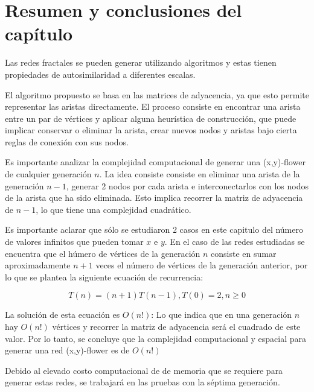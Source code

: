\section{Resumen y conclusiones del capítulo}

Las redes fractales se pueden generar utilizando algoritmos y estas tienen propiedades de autosimilaridad a diferentes escalas.

El algoritmo propuesto se basa en las matrices de adyacencia, ya que esto permite representar las aristas directamente. El proceso consiste en encontrar una arista entre un par de vértices y aplicar alguna heurística de construcción, que puede implicar conservar o eliminar la arista, crear nuevos nodos y aristas bajo cierta reglas de conexión con sus nodos.

Es importante analizar la complejidad computacional de generar una (x,y)-flower de cualquier generación $n$. La idea consiste consiste en eliminar una arista de la generación $n-1$, generar 2 nodos por cada arista e interconectarlos con los nodos de la arista que ha sido eliminada. Esto implica recorrer la matriz de adyacencia de $n-1$, lo que tiene una complejidad cuadrático.

Es importante aclarar que sólo se estudiaron 2 casos en este capitulo del número de valores infinitos que pueden tomar $x$ e $y$. En el caso de las redes estudiadas se encuentra que el húmero de vértices de la generación $n$ consiste en sumar aproximadamente $n+1$ veces el número de vértices de la generación anterior, por lo que se plantea la siguiente ecuación de recurrencia:

\begin{equation}
    T(n)=(n+1)T(n-1), T(0)=2, n \geq 0
\end{equation}

La solución de esta ecuación es $O(n!)$: Lo que indica que en una generación $n$ hay $O(n!)$ vértices y recorrer la matriz de adyacencia será el cuadrado de este valor. Por lo tanto, se concluye que la complejidad computacional y espacial para generar una red (x,y)-flower es de $O(n!)$

Debido al elevado costo computacional de de memoria que se requiere para generar estas redes, se trabajará en las pruebas con la séptima generación.